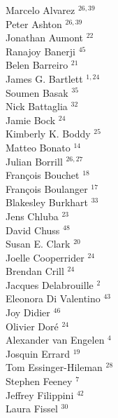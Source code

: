 \documentclass[PICOReport.tex]{subfiles}
\begin{document}
\footnotesize {

\begin{multicols}{4}
Marcelo Alvarez $^{26, 39}$                 \\
Peter Ashton $^{26, 39}$                    \\
Jonathan Aumont $^{22}$                 \\
Ranajoy Banerji $^{45}$                 \\
Belen Barreiro $^{21}$                  \\
James G. Bartlett $^{1,24}$               \\
Soumen Basak $^{35}$                    \\
Nick Battaglia $^{32}$                  \\
Jamie Bock $^{24}$                      \\
Kimberly K. Boddy $^{25}$               \\
Matteo Bonato $^{14}$                   \\
Julian Borrill $^{26,27}$                  \\
Fran\c{c}ois Bouchet $^{18}$            \\
Fran\c{c}ois Boulanger $^{17}$          \\
Blakesley Burkhart $^{33}$              \\
Jens Chluba $^{23}$                     \\
David Chuss $^{48}$                     \\
Susan E. Clark $^{20}$                  \\
Joelle Cooperrider $^{24}$              \\
Brendan Crill $^{24}$                   \\
Jacques Delabrouille $^{2}$            \\
Eleonora Di Valentino $^{43}$           \\
Joy Didier $^{46}$                      \\
Olivier Dor\'e $^{24}$                  \\
Alexander van Engelen $^{4}$           \\
Josquin Errard $^{19}$                  \\
Tom Essinger-Hileman $^{28}$            \\
Stephen Feeney $^{7}$                  \\
Jeffrey Filippini $^{42}$               \\
Laura Fissel $^{30}$                    \\

\end{multicols}}
\end{document}
